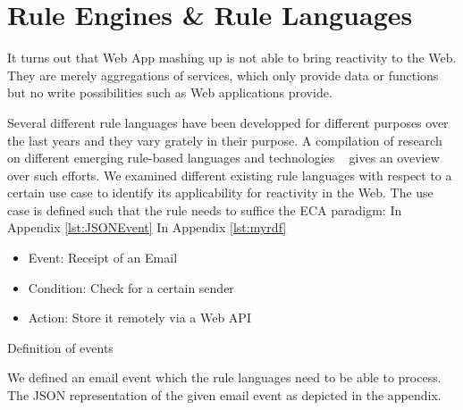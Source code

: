 


\section{Rule Engines \& Rule Languages}

It turns out that Web App mashing up is not able to bring reactivity to the Web.
They are merely aggregations of services, which only provide data or functions but no write possibilities such as Web applications provide.



Several different rule languages have been developped for different purposes over the last years and they vary grately in their purpose.
A compilation of research on different emerging rule-based languages and technologies ~\cite{2009-Paschke_Boley-RCER.pdf} gives an oveview over such efforts.
We examined different existing rule languages with respect to a certain use case to identify its applicability for reactivity in the Web. %
The use case is defined such that the rule needs to suffice the ECA paradigm:
In Appendix \ref{lst:JSONEvent}
In Appendix \ref{lst:myrdf}
\begin{itemize}
  \item Event: Receipt of an Email
  \item Condition: Check for a certain sender
  \item Action: Store it remotely via a Web API
\end{itemize}
Definition of events\cite{Adaikkalavan2007}




We defined an email event which the rule languages need to be able to process.
The JSON representation of the given email event as depicted in the appendix. %

